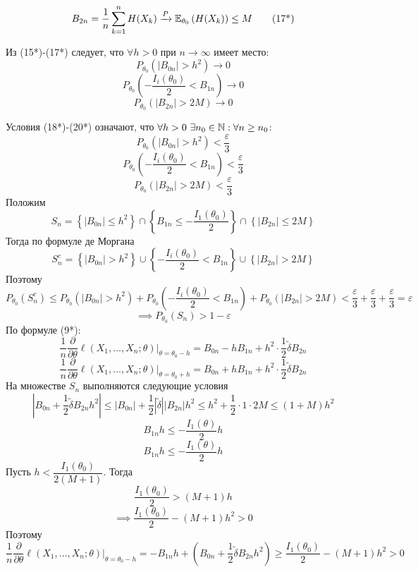 \documentclass[a4paper,11pt]{article}
\begin{document}
{    \[B_{2n} = \frac{1}{n}\sum_{k=1}^{n}H(X_k) \xrightarrow{P} \mathbb{E}_{\theta_0}\left(H(X_k)\right) \leq M \tag{17*}\]

    Из (15*)-(17*) следует, что $\forall h > 0$ при $n \to \infty$ имеет место:
    \[P_{\theta_0}\left(|B_{0n}| > h^2\right) \to 0 \tag{18*}\]
    \[P_{\theta_0}\left(-\frac{I_i(\theta_0)}{2} < B_{1n}\right) \to 0 \tag{19*}\]
    \[P_{\theta_0}\left(|B_{2n}| > 2M\right) \to 0 \tag{20*}\]

    Условия (18*)-(20*) означают, что $\forall h >0\ \exists n_0 \in \mathbb{N}: \forall n \geq n_0$:
    \[P_{\theta_0}\left(|B_{0n}| > h^2\right) < \frac{\varepsilon}{3} \tag{21*}\]
    \[P_{\theta_0}\left(-\frac{I_i(\theta_0)}{2} < B_{1n}\right) < \frac{\varepsilon}{3} \tag{22*}\]
    \[P_{\theta_0}\left(|B_{2n}| > 2M\right) < \frac{\varepsilon}{3} \tag{23*}\]
    Положим
    \[S_n = \left\{|B_{0n}| \leq h^2\right\} \cap \left\{B_{1n} \leq -\frac{I_1(\theta_0)}{2}\right\} \cap \left\{|B_{2n}| \leq 2M\right\}\]
    Тогда по формуле де Моргана
    \[S_n^c = \left\{|B_{0n}| > h^2\right\} \cup \left\{-\frac{I_i(\theta_0)}{2} < B_{1n}\right\} \cup \left\{|B_{2n}| > 2M\right\}\]
    Поэтому
    \[P_{\theta_0}\left(S_n^c\right) \leq P_{\theta_0}\left(|B_{0n}| > h^2\right) + P_{\theta_0}\left(-\frac{I_i(\theta_0)}{2} < B_{1n}\right) + P_{\theta_0}\left(|B_{2n}| > 2M\right) < \frac{\varepsilon}{3} + \frac{\varepsilon}{3} + \frac{\varepsilon}{3} = \varepsilon \tag{24*}\]
    \[\implies P_{\theta_0}(S_n) > 1 - \varepsilon\]
    По формуле (9*):
    \[\frac{1}{n}\frac{\partial}{\partial\theta}\ell(X_1,\dots,X_n;\theta)\Bigg|_{\theta=\theta_0-h} = B_{0n} - hB_{1n} + h^2\cdot\frac{1}{2}\widetilde{\delta}B_{2n} \tag{25*}\]
    \[\frac{1}{n}\frac{\partial}{\partial\theta}\ell(X_1,\dots,X_n;\theta)\Bigg|_{\theta=\theta_0+h} = B_{0n} + hB_{1n} + h^2\cdot\frac{1}{2}\widetilde{\delta}B_{2n} \tag{26*}\]
    На множестве $S_n$ выполняются следующие условия
    \[\left|B_{0n} + \frac{1}{2}\widetilde{\delta}B_{2n}h^2\right| \leq |B_{0n}| + \frac{1}{2}\left|\widetilde{\delta}\right||B_{2n}|h^2 \leq h^2 + \frac{1}{2} \cdot 1 \cdot 2M \leq (1 + M)h^2 \tag{27*}\]
    \[B_{1n}h \leq -\frac{I_1(\theta)}{2}h \tag{28*}\]
    \[B_{1n}h \leq -\frac{I_1(\theta)}{2}h\tag{29*}\]
    Пусть $h < \dfrac{I_1(\theta_0)}{2(M+1)}$. Тогда
    \[\frac{I_1(\theta_0)}{2} > (M+1)h\]
    \[\implies \frac{I_1(\theta_0)}{2} - (M+1)h^2 > 0\tag{30*}\]
    Поэтому
    \[\frac{1}{n}\frac{\partial}{\partial\theta}\ell(X_1,\dots,X_n;\theta)\Bigg|_{\theta=\theta_0-h} = -B_{1n}h + \left(B_{0n} + \frac{1}{2}\widetilde{\delta}B_{2n}h^2\right) \geq \frac{I_1(\theta_0)}{2} - (M+1)h^2 > 0 \tag{31*}\]
}
\end{document}
